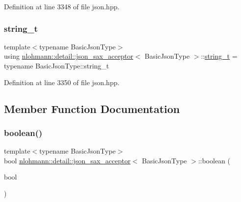 Definition at line 3348 of file json.\+hpp.

\mbox{\label{classnlohmann_1_1detail_1_1json__sax__acceptor_a3a8078bbf865ec355106f6048241609a}} 
\subsubsection{\texorpdfstring{string\_t}{string\_t}}
{\footnotesize\ttfamily template$<$typename Basic\+Json\+Type$>$ \\
using \mbox{\hyperlink{classnlohmann_1_1detail_1_1json__sax__acceptor}{nlohmann\+::detail\+::json\+\_\+sax\+\_\+acceptor}}$<$ Basic\+Json\+Type $>$\+::\mbox{\hyperlink{classnlohmann_1_1detail_1_1json__sax__acceptor_a3a8078bbf865ec355106f6048241609a}{string\+\_\+t}} =  typename Basic\+Json\+Type\+::string\+\_\+t}



Definition at line 3350 of file json.\+hpp.



\subsection{Member Function Documentation}
\mbox{\label{classnlohmann_1_1detail_1_1json__sax__acceptor_a3f5fe42a9b195de8d251d6d98d5ee92c}} 
\subsubsection{\texorpdfstring{boolean()}{boolean()}}
{\footnotesize\ttfamily template$<$typename Basic\+Json\+Type$>$ \\
bool \mbox{\hyperlink{classnlohmann_1_1detail_1_1json__sax__acceptor}{nlohmann\+::detail\+::json\+\_\+sax\+\_\+acceptor}}$<$ Basic\+Json\+Type $>$\+::boolean (\begin{DoxyParamCaption}\item[{bool}]{ }\end{DoxyParamCaption})\hspace{0.3cm}{\ttfamily [inline]}}



